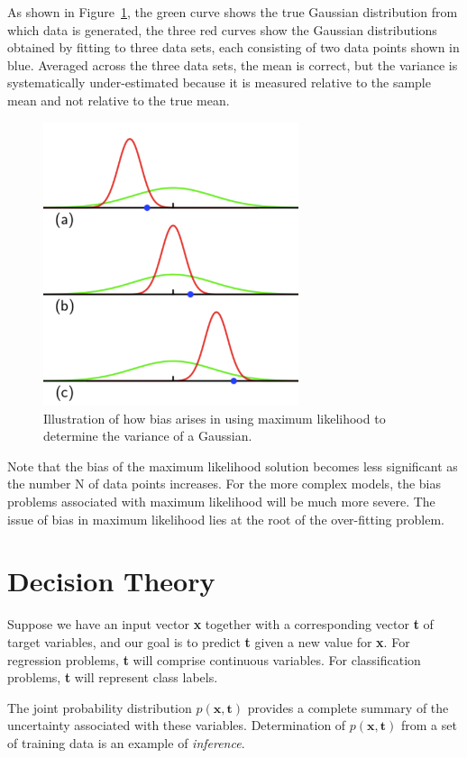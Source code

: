 \documentclass[5p,sort&compress]{elsarticle}
\begin{document}
As shown in Figure~\ref{fig:1.15}, the green curve shows the true Gaussian distribution from which data is generated, the three red curves show the Gaussian distributions obtained by fitting to three data sets, each consisting of two data points shown in blue. Averaged across the three data sets, the mean is correct, but the variance is systematically under-estimated because it is measured relative to the sample mean and not relative to the true mean.
\begin{figure}
    \centering
    \includegraphics[width=7.5cm]{figure/mle_bias.png}
    \caption{Illustration of how bias arises in using maximum likelihood to determine the variance of a Gaussian.}
    \label{fig:1.15}
\end{figure}

Note that the bias of the maximum likelihood solution becomes less significant as the number N of data points increases. For the more complex models, the bias problems associated with maximum likelihood will be much more severe. The issue of bias in maximum likelihood lies at the root of the over-fitting problem.


\section{Decision Theory} 

Suppose we have an input vector \textbf{x} together with a corresponding vector \textbf{t} of target variables, and our goal is to predict \textbf{t} given a new value for \textbf{x}. For regression problems, \textbf{t} will comprise continuous variables. For classification problems, \textbf{t} will represent class labels.

The joint probability distribution $p(\textbf{x}, \textbf{t})$ provides a complete summary of the uncertainty associated with these variables. Determination of $p(\textbf{x}, \textbf{t})$ from a set of training data is an example of \textit{inference}.
\end{document}
